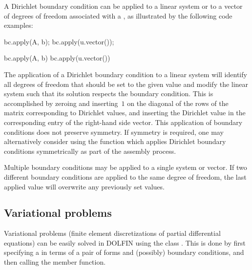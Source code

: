 A Dirichlet boundary condition can be applied to a linear system or to
a vector of degrees of freedom associated with a , as
illustrated by the following code examples:
\begin{c++}
bc.apply(A, b);
bc.apply(u.vector());
\end{c++}
\begin{python}
bc.apply(A, b)
bc.apply(u.vector())
\end{python}
The application of a Dirichlet boundary condition to a linear system
will identify all degrees of freedom that should be set to the given
value and modify the linear system such that its solution respects the
boundary condition. This is accomplished by zeroing and inserting~$1$
on the diagonal of the rows of the matrix corresponding to Dirichlet
values, and inserting the Dirichlet value in the corresponding entry
of the right-hand side vector. This application of boundary conditions
does not preserve symmetry. If symmetry is required, one may
alternatively consider using the  function which
applies Dirichlet boundary conditions symmetrically as part of the
assembly process.

Multiple boundary conditions may be applied to a single system or
vector. If two different boundary conditions are applied to the same
degree of freedom, the last applied value will overwrite any
previously set values.

\subsection{Variational problems}

Variational problems (finite element discretizations of partial
differential equations) can be easily solved in DOLFIN using the class
. This is done by first specifying a
 in terms of a pair of forms and (possibly)
boundary conditions, and then calling the  member function.

